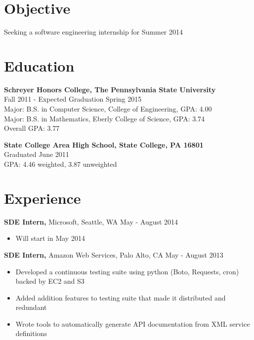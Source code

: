 \documentclass[margin]{res}
\begin{document}
 
\address{{\bf Present Address} \\ 428 West Nittany Avenue \\ Apartment 3 \\ State College, PA 16801 \\
        (814) 574-8768 }
\address{{\bf Permanent Address} \\ 3144 Williamsburg Court \\ State College, PA 16801 \\ (814) 574-0111 \\ douglasjordan0@gmail.com } 
\begin{resume} 
 
\section{Objective} 
Seeking a software engineering internship for Summer 2014

\section{Education} 
{\bf Schreyer Honors College, The Pennsylvania State University} \\
Fall 2011 - Expected Graduation Spring 2015 \\
Major: B.S. in Computer Science, College of Engineering, GPA: 4.00 \\
Major: B.S. in Mathematics, Eberly College of Science, GPA: 3.74 \\
Overall GPA: 3.77

{\bf State College Area High School, State College, PA 16801} \\
Graduated June 2011 \\
GPA: 4.46 weighted, 3.87 unweighted

\section{Experience}

{\bf SDE Intern,} Microsoft, Seattle, WA \hfill May - August 2014
\begin{itemize} \itemsep -2pt  %
\item Will start in May 2014
\end{itemize}

{\bf SDE Intern,} Amazon Web Services, Palo Alto, CA \hfill May - August 2013
\begin{itemize} \itemsep -2pt  %
\item Developed a continuous testing suite using python (Boto, Requests, cron) backed by EC2 and S3
\item Added addition features to testing suite that made it distributed and redundant 
\item Wrote tools to automatically generate API documentation from XML service definitions
\end{itemize}


\end{resume}
\end{document}
